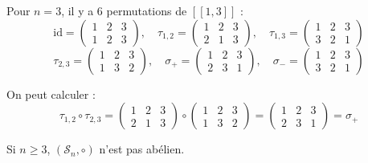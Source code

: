 \begin{Example}{}{}
  Pour $n=3$, il y a 6 permutations de $[\![1, 3]\!]$ : 
  \begin{equation}
    \mathrm{id} = \begin{pmatrix}
      1 & 2 & 3 \\ 1 & 2 & 3
    \end{pmatrix}, \quad \tau _{1,2} = \begin{pmatrix}
      1 & 2 & 3 \\ 2 & 1 &3 
    \end{pmatrix}, \quad \tau _{1,3} = \begin{pmatrix}
      1 & 2 & 3 \\ 3 & 2 &1 
    \end{pmatrix}
  \end{equation}
  \begin{equation}
    \tau _{2, 3} = \begin{pmatrix}
      1 & 2 & 3 \\ 1 & 3 & 2
    \end{pmatrix}, \quad
    \sigma_+ = \begin{pmatrix}
      1 & 2 & 3 \\ 2 & 3 & 1
    \end{pmatrix}, \quad \sigma_- = \begin{pmatrix}
      1 & 2 & 3 \\ 3 & 2 & 1
    \end{pmatrix}
  \end{equation}
\end{Example}



\begin{Example}{}{}
On peut calculer : 
\begin{equation}
\tau _{1,2} \circ \tau _{2,3} = \begin{pmatrix}
  1 & 2 & 3 \\ 2 & 1 & 3
\end{pmatrix} \circ \begin{pmatrix}
  1 & 2 & 3 \\ 1 & 3 & 2
\end{pmatrix} = \begin{pmatrix}
  1 & 2 & 3 \\ 2 & 3 & 1
\end{pmatrix} = \sigma_+
\end{equation}
\end{Example}


\begin{Prop}{}{}
Si $n \ge 3$, $(\mathscr{S}_n, \circ)$ n'est pas abélien.
\end{Prop}


